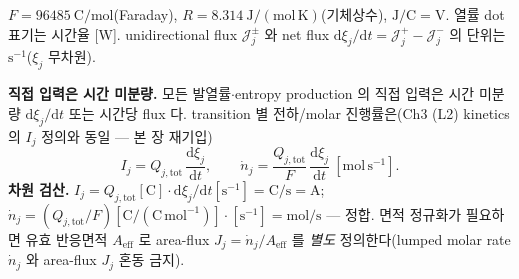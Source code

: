 \documentclass[11pt,a4paper]{article}
\newcommand{\dd}{\mathrm{d}}
\newcommand{\eff}{\mathrm{eff}}
\newcommand{\tot}{\mathrm{tot}}
\begin{document}
$F=96485\ \mathrm{C/mol}$(Faraday), $R=8.314\ \mathrm{J/(mol\,K)}$(기체상수), $\mathrm{J/C}=\mathrm V$. 열률 dot
표기는 시간율 [W]. unidirectional flux $\mathcal J_j^\pm$ 와 net flux $\dd\xi_j/\dd t=\mathcal J_j^+-\mathcal J_j^-$
의 단위는 $\mathrm{s^{-1}}$($\xi_j$ 무차원).

\textbf{직접 입력은 시간 미분량.} 모든 발열률$\cdot$entropy production 의 직접 입력은 시간 미분량 $\dd\xi_j/\dd t$
또는 시간당 flux 다. transition 별 전하/molar 진행률은(Ch3 (L2) kinetics 의 $I_j$ 정의와 동일 — 본 장 재기입)
\begin{equation}
I_j=Q_{j,\tot}\,\frac{\dd\xi_j}{\dd t},\qquad
\dot n_j=\frac{Q_{j,\tot}}{F}\,\frac{\dd\xi_j}{\dd t}\ [\mathrm{mol\,s^{-1}}].
\label{eq:ch4_Ij}
\end{equation}
\textbf{차원 검산.} $I_j=Q_{j,\tot}[\mathrm C]\cdot\dd\xi_j/\dd t[\mathrm{s^{-1}}]=\mathrm{C/s}=\mathrm A$;
$\dot n_j=(Q_{j,\tot}/F)[\mathrm{C}/(\mathrm{C\,mol^{-1}})]\cdot[\mathrm{s^{-1}}]=\mathrm{mol/s}$ — 정합. 면적
정규화가 필요하면 유효 반응면적 $A_{\eff}$ 로 area-flux $J_j=\dot n_j/A_{\eff}$ 를 \emph{별도} 정의한다(lumped
molar rate $\dot n_j$ 와 area-flux $J_j$ 혼동 금지).

\end{document}
